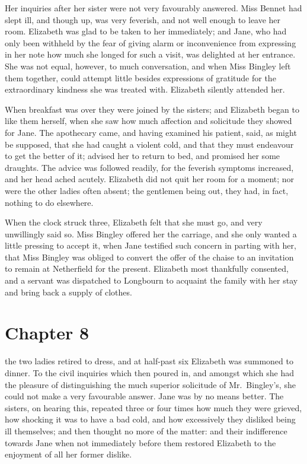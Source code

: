 Her inquiries after her sister were not very favourably answered.
Miss Bennet had slept ill, and though up, was very feverish, and
not well enough to leave her room.  Elizabeth was glad to be
taken to her immediately; and Jane, who had only been withheld
by the fear of giving alarm or inconvenience from expressing in
her note how much she longed for such a visit, was delighted at
her entrance.  She was not equal, however, to much conversation,
and when Miss Bingley left them together, could attempt little
besides expressions of gratitude for the extraordinary kindness
she was treated with.  Elizabeth silently attended her.

When breakfast was over they were joined by the sisters; and
Elizabeth began to like them herself, when she saw how much
affection and solicitude they showed for Jane.  The apothecary
came, and having examined his patient, said, as might be
supposed, that she had caught a violent cold, and that they must
endeavour to get the better of it; advised her to return to bed,
and promised her some draughts.  The advice was followed
readily, for the feverish symptoms increased, and her head ached
acutely.  Elizabeth did not quit her room for a moment; nor were
the other ladies often absent; the gentlemen being out, they had,
in fact, nothing to do elsewhere.

When the clock struck three, Elizabeth felt that she must go, and
very unwillingly said so.  Miss Bingley offered her the carriage,
and she only wanted a little pressing to accept it, when Jane
testified such concern in parting with her, that Miss Bingley was
obliged to convert the offer of the chaise to an invitation to
remain at Netherfield for the present.  Elizabeth most thankfully
consented, and a servant was dispatched to Longbourn to
acquaint the family with her stay and bring back a supply of
clothes.



\chapter{Chapter 8}


 the two ladies retired to dress, and at half-past
six Elizabeth was summoned to dinner.  To the civil inquiries
which then poured in, and amongst which she had the pleasure
of distinguishing the much superior solicitude of Mr.\ Bingley's,
she could not make a very favourable answer.  Jane was by no
means better.  The sisters, on hearing this, repeated three or four
times how much they were grieved, how shocking it was to have
a bad cold, and how excessively they disliked being ill
themselves; and then thought no more of the matter: and their
indifference towards Jane when not immediately before them
restored Elizabeth to the enjoyment of all her former dislike.

